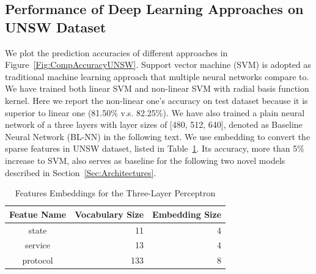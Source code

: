 \subsection{Performance of Deep Learning Approaches on UNSW Dataset} 
We plot the prediction accuracies of different approaches in Figure~\ref{Fig:CompAccuracyUNSW}.
Support vector machine (SVM) is adopted as traditional machine learning approach that multiple neural networks compare to.
We have trained both linear SVM and non-linear SVM with radial basis function kernel.
Here we report the non-linear one's
accuracy on test dataset because it is superior to linear one (81.50\% v.s. 82.25\%).
We have also trained a plain neural network of a three layers with layer sizes of [480, 512, 640],
denoted as Baseline Neural Network (BL-NN) in the following text.
We use embedding to convert the sparse features in UNSW dataset, listed in Table~\ref{Tab:SparseFeatures}.
Its accuracy, more than 5\% increase to SVM, also serves as baseline for the following two novel models
described in Section~\ref{Sec:Architectures}.
\begin{table}[]
\centering
\caption{Features Embeddings for the Three-Layer Perceptron}
\label{Tab:SparseFeatures}
\begin{tabular}{c|r|r}
Featue Name & \multicolumn{1}{c|}{Vocabulary Size} & \multicolumn{1}{c}{Embedding Size} \\
\hline
\hline
state       & 11                                  & 4                                  \\
service     & 13                                  & 4                                  \\
protocol    & 133                                 & 8                                 
\end{tabular}
\end{table}

